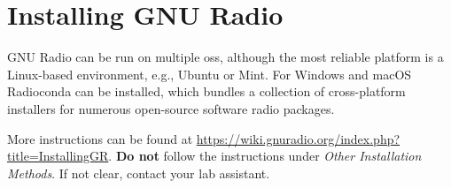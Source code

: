 




\section{Installing GNU Radio}

GNU Radio can be run on multiple \glspl{os}, although the most reliable platform is a Linux-based environment, e.g., Ubuntu or Mint.
For Windows and macOS Radioconda can be installed, which bundles a collection of cross-platform installers for numerous open-source software radio packages.

More instructions can be found at \url{https://wiki.gnuradio.org/index.php?title=InstallingGR}. \textbf{Do not} follow the instructions under \textit{Other Installation Methods}. If not clear, contact your lab assistant.






